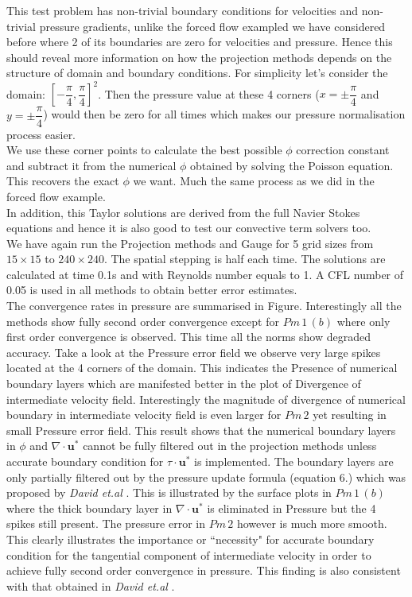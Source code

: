 This test problem has non-trivial boundary conditions for velocities and non-trivial pressure gradients, unlike the forced flow exampled we have considered before where 2 of its boundaries are zero for velocities and pressure. Hence this should reveal more information on how the projection methods depends on the structure of domain and boundary conditions. For simplicity let's consider the domain: $[-\dfrac{\pi}{4}, \dfrac{\pi}{4}]^2$. Then the pressure value at these 4 corners ($x = \pm \dfrac{\pi}{4}$ and $y = \pm \dfrac{\pi}{4}$) would then be zero for all times which makes our pressure normalisation process easier.\\

We use these corner points to calculate the best possible $\phi$ correction constant and subtract it from the numerical $\phi$ obtained by solving the Poisson equation. This recovers the exact $\phi$ we want. Much the same process as we did in the forced flow example.\\

In addition, this Taylor solutions are derived from the full Navier Stokes equations and hence it is also good to test our convective term solvers too.\\

We have again run the Projection methods and Gauge for 5 grid sizes from $15 \times 15$ to $240 \times 240$. The spatial stepping is half each time. The solutions are calculated at time 0.1s and with Reynolds number equals to 1. A CFL number of 0.05 is used in all methods to obtain better error estimates.\\

The convergence rates in pressure are summarised in Figure. Interestingly all the methods show fully second order convergence except for $Pm\,1\,(b)$ where only first order convergence is observed. This time all the norms show degraded accuracy. Take a look at the Pressure error field we observe very large spikes located at the 4 corners of the domain. This indicates the Presence of numerical boundary layers which are manifested better in the plot of Divergence of intermediate velocity field. Interestingly the magnitude of divergence of numerical boundary in intermediate velocity field is even larger for $Pm\,2$ yet resulting in small Pressure error field. This result shows that the numerical boundary layers in $\phi$ and $\nabla \cdot \textbf{u}^*$ cannot be fully filtered out in the projection methods unless accurate boundary condition for $\textbf{$\tau$} \cdot \textbf{u}^*$ is implemented. The boundary layers are only partially filtered out by the pressure update formula (equation 6.) which was proposed by \emph{David et.al} \cite{brown2001accurate}. This is illustrated by the surface plots in $Pm\,1\,(b)$ where the thick boundary layer in $\nabla \cdot \textbf{u}^*$ is eliminated in Pressure but the 4 spikes still present. The pressure error  in $Pm\,2$  however is much more smooth. This clearly illustrates the importance or ``necessity" for accurate boundary condition for the tangential component of intermediate velocity in order to achieve fully second order convergence in pressure. This finding is also consistent with that obtained in \emph{David et.al} \cite{brown2001accurate}.\\

